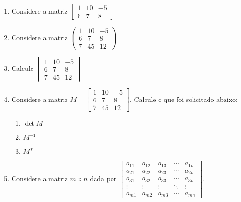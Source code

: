 \documentclass[a4paper, 12pt]{article}
\begin{document}
\begin{enumerate}
    \item Considere a matriz 
    $
    \begin{bmatrix} %
    1 & 10 & -5 \\ %
    6 & 7 & 8
    \end{bmatrix}
    $
    
    \item Considere a matriz 
    $
    \begin{pmatrix} %
    1 & 10 & -5 \\
    6 & 7 & 8 \\
    7 & 45 & 12
    \end{pmatrix}
    $
    
    \item Calcule
    $
    \begin{vmatrix} %
    1 & 10 & -5 \\
    6 & 7 & 8 \\
    7 & 45 & 12
    \end{vmatrix}
    $
    
    \item Considere a matriz 
    $M =
    \begin{bmatrix} 
    1 & 10 & -5 \\ 
    6 & 7 & 8 \\
    7 & 45 & 12
    \end{bmatrix}
    $.
    Calcule o que foi solicitado abaixo:
    
    \begin{enumerate}
        \item $\det M$ %
        \item $M^{-1}$
        \item $M^T$
    \end{enumerate}
    
     \item Considere a matriz $m \times n$ dada por 
    $
    \begin{bmatrix} 
        a_{11} & a_{12} & a_{13} & \cdots & a_{1n} \\ %
        a_{21} & a_{22} & a_{23} & \cdots & a_{2n} \\
        a_{31} & a_{32} & a_{33} & \cdots & a_{3n} \\
        \vdots & \vdots & \vdots & \ddots & \vdots \\%
        a_{m1} & a_{m2} & a_{m3} & \cdots & a_{mn}
    \end{bmatrix}
    $.
   

\end{enumerate}
\end{document}
